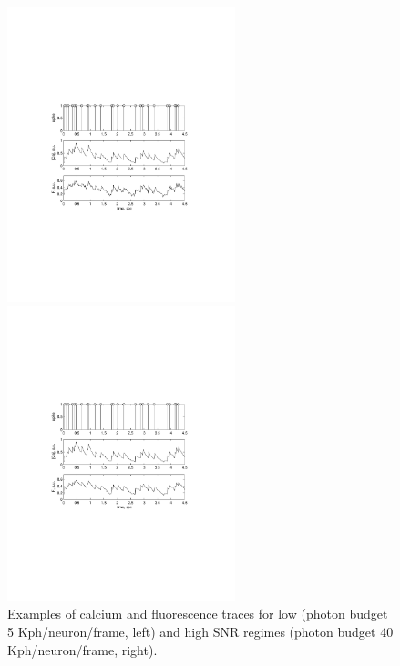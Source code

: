\documentclass[amsmath,amssymb]{revtex4}
\begin{document}
\begin{figure}
\centering
\begin{minipage}[c]{0.45\hsize}
\includegraphics[width=250px]{Figure0b_fluor_eg_hlowSNR}
\end{minipage}
\begin{minipage}[c]{0.45\hsize}
\includegraphics[width=250px]{Figure0a_fluor_eg_highSNR}
\end{minipage}
\caption{Examples of calcium and fluorescence traces for low (photon budget 5 Kph/neuron/frame, left)
and high SNR regimes (photon budget 40 Kph/neuron/frame, right).}
\label{fig:egfluor}
\end{figure}
\end{document}
